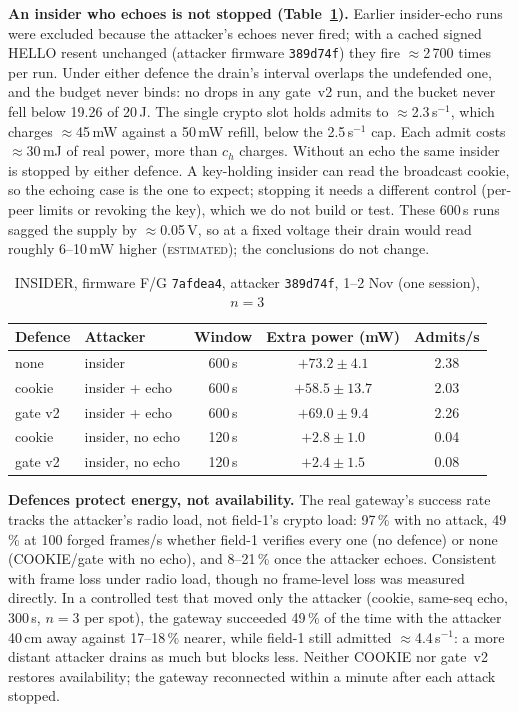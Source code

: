 \documentclass[conference]{IEEEtran}
\newcommand{\est}{\textsc{estimated}}
\begin{document}
\textbf{An insider who echoes is not stopped (Table~\ref{tab:insider}).} Earlier insider-echo runs were excluded
because the attacker's echoes never fired; with a cached signed HELLO resent unchanged (attacker firmware
\texttt{389d74f}) they fire $\approx$2\,700 times per run. Under either defence the drain's interval overlaps the
undefended one, and the budget never binds: no drops in any gate~v2 run, and the bucket never fell below 19.26 of
20\,J. The
single crypto slot holds admits to $\approx$2.3\,s$^{-1}$, which charges $\approx$45\,mW against a 50\,mW refill,
below the 2.5\,s$^{-1}$ cap. Each admit costs $\approx$30\,mJ of real power, more than $c_h$ charges. Without an
echo the same insider is stopped by either defence. A key-holding insider can read the broadcast cookie, so the
echoing case is the one to expect; stopping it needs a different control (per-peer limits or revoking the key),
which we do not build or test. These 600\,s runs sagged the supply by $\approx$0.05\,V, so at a fixed voltage their
drain would read roughly 6--10\,mW higher (\est{}); the conclusions do not change.

\begin{table}[t]
\caption{INSIDER, firmware F/G \texttt{7afdea4}, attacker \texttt{389d74f}, 1--2 Nov (one session), $n=3$}
\label{tab:insider}
\centering\footnotesize
\setlength{\tabcolsep}{3pt}
\begin{tabular}{llccc}
\toprule
Defence & Attacker & Window & Extra power (mW) & Admits/s\\
\midrule
none & insider & 600\,s & $+73.2\pm4.1$ & 2.38\\
cookie & insider + echo & 600\,s & $+58.5\pm13.7$ & 2.03\\
gate v2 & insider + echo & 600\,s & $+69.0\pm9.4$ & 2.26\\
cookie & insider, no echo & 120\,s & $+2.8\pm1.0$ & 0.04\\
gate v2 & insider, no echo & 120\,s & $+2.4\pm1.5$ & 0.08\\
\bottomrule
\end{tabular}
\end{table}

\textbf{Defences protect energy, not availability.} The real gateway's success rate tracks the attacker's radio
load, not field-1's crypto load: 97\,\% with no attack, 49\,\% at 100 forged frames/s whether field-1 verifies
every one (no defence) or none (COOKIE/gate with no echo), and 8--21\,\% once the attacker echoes. Consistent with
frame loss under radio load, though no frame-level loss was measured directly. In a controlled test that moved
only the attacker (cookie, same-seq echo, 300\,s, $n=3$ per spot), the gateway succeeded 49\,\% of the time with
the attacker 40\,cm away against 17--18\,\% nearer, while field-1 still admitted $\approx$4.4\,s$^{-1}$: a more
distant attacker drains as much but blocks less. Neither COOKIE nor gate~v2 restores availability; the gateway
reconnected within a minute after each attack stopped.
\end{document}
